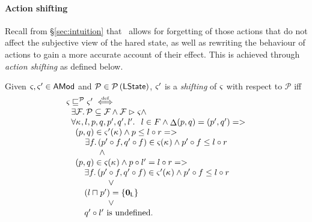 \paragraph{Action shifting}
Recall from \S\ref{sec:intuition} that \colosl\ allows for forgetting of those  actions that do not affect the subjective view of the hared state, as well as rewriting the behaviour of actions to gain a more accurate account of their effect. This is achieved through \emph{action shifting} as defined below.
\begin{definition}
  Given $\varsigma_{}, \varsigma_{}' \in \textsf{AMod}$ and $\mathcal{P} \in
  \mathcal{P}\left(\textsf{LState} \right)$, $\varsigma_{}'$ is a \emph{shifting} of $\varsigma_{}$ with
  respect to $\mathcal{P}$ iff
  \[
  \begin{array}{l}
    \varsigma_{} \sqsubseteq^{\mathcal{P}}  \varsigma_{}' \mathrel{\stackrel{\smash{\scriptscriptstyle{\mathrm{def}}}}{\iff}} \\
    \hspace*{0.2cm} \exists \mathcal{F}_{}.\, \mathcal{P} \subseteq \mathcal{F}_{} \land \mathcal{F}_{} \mathrel{\rhd} \varsigma_{} \land\\
    \hspace*{0.2cm}\forall \kappa_{}, l, p, q, p', q', l'.\,\;\; l \in F \land \mathop{\Delta}(p, q) = (p', q') =>\\
    \hspace*{0.2cm}
    \begin{array}{l}
      (p, q) \in \varsigma_{}'(\kappa_{}) 
      \land p \leq l \circ r => \\
      \hspace*{0.4cm}\exists f.\, (p' \circ f, q' \circ f) \in \varsigma_{}(\kappa_{}) \land p' \circ f \leq l \circ r \\
      
      \hspace*{1cm} \land\\
      
      (p, q) \in \varsigma_{}(\kappa_{})
      \land p \circ l' = l \circ r => \\
      \hspace*{0.2cm}
      \begin{array}{l}
	\exists f.\, (p' \circ f, q' \circ f) \in \varsigma_{}'(\kappa_{}) \land p' \circ f \leq l \circ r \\
	\hspace*{1cm} \lor\\
	\left( l \sqcap_{} p' \right) = \left\{ \mathbf{0}_{\textsf{L}} \right\}\\
	\hspace*{1cm} \lor\\
	q' \circ l' \text{ is undefined}.
      \end{array}
    \end{array}
  \end{array}
  \]
\end{definition}

